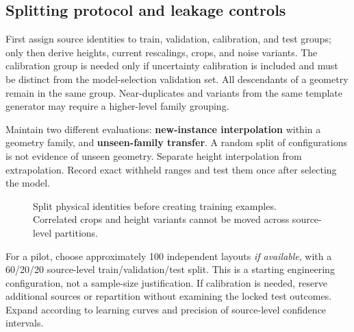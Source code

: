 \subsection{Splitting protocol and leakage controls}
First assign source identities to train, validation, calibration, and test groups; only then derive heights, current rescalings, crops, and noise variants. The calibration group is needed only if uncertainty calibration is included and must be distinct from the model-selection validation set. All descendants of a geometry remain in the same group. Near-duplicates and variants from the same template generator may require a higher-level family grouping.

Maintain two different evaluations: \textbf{new-instance interpolation} within a geometry family, and \textbf{unseen-family transfer}. A random split of configurations is not evidence of unseen geometry. Separate height interpolation from extrapolation. Record exact withheld ranges and test them once after selecting the model.

\begin{figure}[htbp]\centering
{}
\caption{Split physical identities before creating training examples. Correlated crops and height variants cannot be moved across source-level partitions.}
\end{figure}

For a pilot, choose approximately 100 independent layouts \emph{if available}, with a 60/20/20 source-level train/validation/test split. This is a starting engineering configuration, not a sample-size justification. If calibration is needed, reserve additional sources or repartition without examining the locked test outcomes. Expand according to learning curves and precision of source-level confidence intervals.

